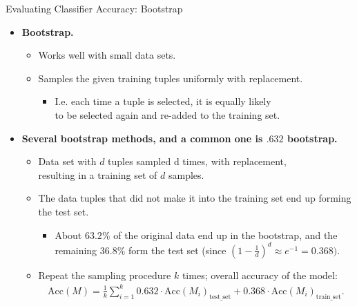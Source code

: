 \begin{frame}{Evaluating Classifier Accuracy: Bootstrap}
  \begin{itemize}
  \item \textbf{Bootstrap.}
    \begin{itemize}
    \item Works well with small data sets.
    \item Samples the given training tuples uniformly with replacement.
      \begin{itemize}
      \item I.e. each time a tuple is selected, it is equally likely \\
        to be selected again and re-added to the training set.
      \end{itemize}
    \end{itemize}
  \item \textbf{Several bootstrap methods, and a common one is $.632$ bootstrap.}
    \begin{itemize}
    \item Data set with $d$ tuples sampled d times, with replacement, \\
      resulting in a training set of $d$ samples.
    \item The data tuples that did not make it into the training set end up forming the test set.
      \begin{itemize}
      \item About $63.2\%$ of the original data end up in the bootstrap, and the remaining $36.8\%$ form the test set (since $(1-\frac{1}{d})^d \approx e^{-1} = 0.368)$.
      \end{itemize}
    \item Repeat the sampling procedure $k$ times; overall accuracy of the model:
      \begin{align}
        \text{Acc}(M) = \frac{1}{k} \sum_{i=1}^{k} 0.632 \cdot \text{Acc}(M_i)_{\text{test\_set}} + 0.368 \cdot \text{Acc}(M_i)_{\text{train\_set}}.
      \end{align}
    \end{itemize}
  \end{itemize}
\end{frame}

